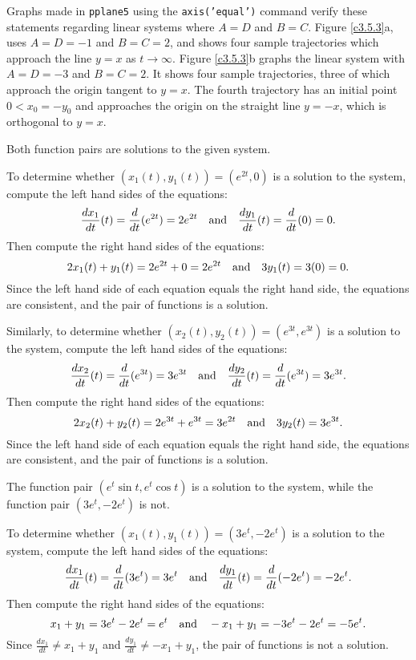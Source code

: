 \documentclass{ximera}
\begin{document}
Graphs made in {\tt pplane5} using the {\tt axis('equal')} command
verify these statements regarding linear systems where $A = D$
and $B = C$.  Figure \ref{c3.5.3}a, uses $A = D = -1$ and
$B = C = 2$, and shows four sample trajectories which approach
the line $y = x$ as $t \rightarrow \infty$.  Figure
\ref{c3.5.3}b graphs the linear system with $A = D = -3$
and $B = C = 2$.  It shows four sample trajectories, three of
which approach the origin tangent to $y = x$.  The fourth
trajectory has an initial point $0 < x_0 = -y_0$ and approaches
the origin on the straight line $y = -x$, which is orthogonal
to $y = x$.

\begin{figure}[htb]
                       \centerline{%
                       }
\end{figure}

 \ans Both function pairs are solutions to the given system.

\soln To determine whether $(x_1(t),y_1(t)) = (e^{2t},0)$ is
a solution to the system, compute the left hand sides of the equations:
\[
\frac{dx_1}{dt}(t) = \frac{d}{dt}(e^{2t}) = 2e^{2t} \quad\mbox{and}\quad
\frac{dy_1}{dt}(t) = \frac{d}{dt}(0) = 0.
\]
Then compute the right hand sides of the equations:
\[
2x_1(t) + y_1(t) = 2e^{2t} + 0 = 2e^{2t} \quad\mbox{and}\quad
3y_1(t) = 3(0) = 0.
\]
Since the left hand side of each equation equals the right hand side, the
equations are consistent, and the pair of functions is a solution.

\para Similarly, to determine whether $(x_2(t),y_2(t)) = (e^{3t},e^{3t})$
is a solution to the system, compute the left hand sides of the equations:
\[
\frac{dx_2}{dt}(t) = \frac{d}{dt}(e^{3t}) = 3e^{3t} \quad\mbox{and}\quad
\frac{dy_2}{dt}(t) = \frac{d}{dt}(e^{3t}) = 3e^{3t}.
\]
Then compute the right hand sides of the equations:
\[
2x_2(t) + y_2(t) = 2e^{3t} + e^{3t} = 3e^{2t} \quad\mbox{and}\quad
3y_2(t) = 3e^{3t}.
\]
Since the left hand side of each equation equals the right hand side, the
equations are consistent, and the pair of functions is a solution.

 \ans The function pair $(e^t\sin{t},e^t\cos{t})$ is a
solution to the system, while the function pair $(3e^t,-2e^t)$ is not.

\soln To determine whether $(x_1(t),y_1(t)) = (3e^t,-2e^t)$ is
a solution to the system, compute the left hand sides of the equations:
\[
\frac{dx_1}{dt}(t) = \frac{d}{dt}(3e^t) = 3e^t \quad\mbox{and}\quad
\frac{dy_1}{dt}(t) = \frac{d}{dt}(-2e^t) = -2e^t.
\]
Then compute the right hand sides of the equations:
\[
x_1 + y_1 = 3e^t - 2e^t = e^t \quad\mbox{and}\quad
-x_1 + y_1 = -3e^t - 2e^t = -5e^t.
\]
Since $\frac{dx_1}{dt} \neq x_1 + y_1$ and $\frac{dy_1}{dt} \neq -x_1 + y_1$,
the pair of functions is not a solution.
\end{document}
